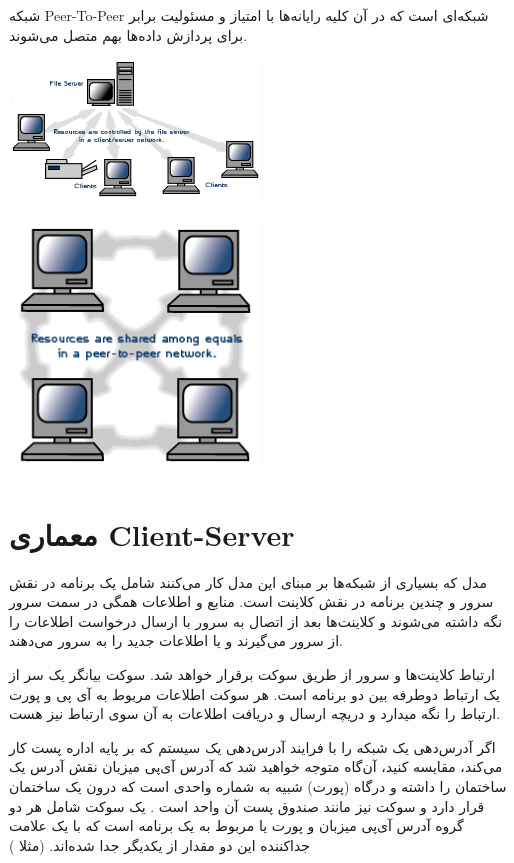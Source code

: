 \documentclass[]{article}
\begin{document}
شبکه Peer-To-Peer شبکه‌ای است که در آن کلیه رایانه‌ها با امتیاز و مسئولیت برابر برای پردازش داده‌ها بهم متصل می‌شوند.

\begin{center}
\includegraphics[width=0.5\textwidth]{images/4.png}
\end{center}


\begin{center}
\includegraphics[width=0.5\textwidth]{images/5.png}
\end{center}

\newpage
\section*{{\titr معماری Client-Server}}

مدل  که بسیاری از شبکه‌ها بر مبنای این مدل کار می‌کنند شامل یک برنامه در نقش سرور و چندین برنامه در نقش کلاینت است. منابع و اطلاعات همگی در سمت سرور نگه داشته می‌شوند و کلاینت‌ها بعد از اتصال به سرور با ارسال درخواست اطلاعات را از سرور می‌گیرند و یا اطلاعات جدید را به سرور می‌دهند.

 ارتباط کلاینت‌ها و سرور از طریق سوکت برقرار خواهد شد. سوکت بیانگر یک سر از یک ارتباط دوطرفه بین دو برنامه است. هر سوکت اطلاعات مربوط به آی پی و پورت ارتباط را نگه میدارد و دریچه ارسال و دریافت اطلاعات به آن سوی ارتباط نیز هست.
 
 اگر آدرس‌دهی یک شبکه را با فرایند آدرس‌دهی یک سیستم که بر پایه اداره پست کار می‌کند، مقایسه کنید، آن‌گاه متوجه خواهید شد که آدرس آی‌پی میزبان نقش آدرس یک ساختمان را داشته و درگاه (پورت) شبیه به شماره واحدی است که درون یک ساختمان قرار دارد و سوکت نیز مانند صندوق پست آن واحد است . یک سوکت شامل هر دو گروه آدرس آی‌پی میزبان و پورت  یا  مربوط به یک برنامه است که با یک علامت جداکننده این دو مقدار از یکدیگر جدا شده‌اند. (مثلا )
\end{document}
